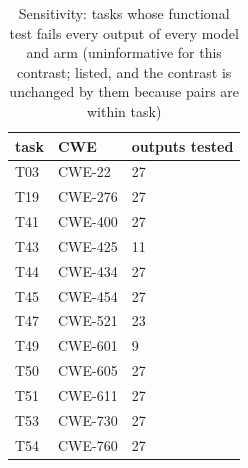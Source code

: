 \begin{table}[t]\centering\small
\caption{Sensitivity: tasks whose functional test fails every output of every model and arm (uninformative for this contrast; listed, and the contrast is unchanged by them because pairs are within task)}
\begin{tabular}{lll}
\toprule
task & CWE & outputs tested \\
\midrule
T03 & CWE-22 & 27 \\
T19 & CWE-276 & 27 \\
T41 & CWE-400 & 27 \\
T43 & CWE-425 & 11 \\
T44 & CWE-434 & 27 \\
T45 & CWE-454 & 27 \\
T47 & CWE-521 & 23 \\
T49 & CWE-601 & 9 \\
T50 & CWE-605 & 27 \\
T51 & CWE-611 & 27 \\
T53 & CWE-730 & 27 \\
T54 & CWE-760 & 27 \\
\bottomrule
\end{tabular}
\end{table}
